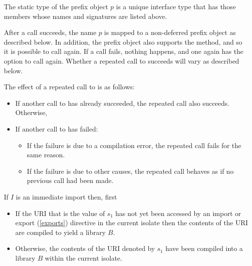 \documentclass[makeidx]{article}
\begin{document}
{The static type of the prefix object $p$ is a unique interface type that has those members whose names and signatures are listed above.

\LMHash{}%
After a call succeeds, the name $p$ is mapped to a non-deferred prefix object as described below.
In addition, the prefix object also supports the  method, and so it is possible to call  again.
If a call fails, nothing happens, and one again has the option to call  again.
Whether a repeated call to  succeeds will vary as described below.

\LMHash{}%
The effect of a repeated call to  is as follows:
\begin{itemize}
\item
If another call to  has already succeeded, the repeated call also succeeds.
Otherwise,
\item
If another call to  has failed:
\begin{itemize}
\item
If the failure is due to a compilation error, the repeated call fails for the same reason.
\item
If the failure is due to other causes, the repeated call behaves as if no previous call had been made.
\end{itemize}
\end{itemize}


\LMHash{}%
If $I$ is an immediate import then, first

\begin{itemize}
\item
If the URI that is the value of $s_1$ has not yet been accessed by an import or export (\ref{exports}) directive in the current isolate then the contents of the URI are compiled to yield a library $B$.
\item Otherwise, the contents of the URI denoted by $s_1$ have been compiled into a library $B$ within the current isolate.
\end{itemize}

}
\end{document}
